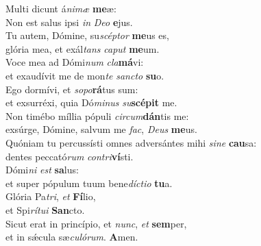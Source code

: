 \evenverse Multi dicunt á\textit{ni}\textit{mæ} \textbf{me}æ:~\*\\
\evenverse Non est salus ipsi \textit{in} \textit{De}\textit{o} \textbf{e}jus.\\
\oddverse Tu autem, Dómine, su\textit{scép}\textit{tor} \textbf{me}us es,~\*\\
\oddverse glória mea, et exál\textit{tans} \textit{ca}\textit{put} \textbf{me}um.\\
\evenverse Voce mea ad Dómi\textit{num} \textit{cla}\textbf{má}vi:~\*\\
\evenverse et exaudívit me de mon\textit{te} \textit{san}\textit{cto} \textbf{su}o.\\
\oddverse Ego dormívi, et \textit{so}\textit{po}\textbf{rá}tus sum:~\*\\
\oddverse et exsurréxi, quia Dó\textit{mi}\textit{nus} \textit{su}\textbf{scé}\textbf{pit} me.\\
\evenverse Non timébo míllia pópuli \textit{cir}\textit{cum}\textbf{dán}tis me:~\*\\
\evenverse exsúrge, Dómine, salvum me \textit{fac}, \textit{De}\textit{us} \textbf{me}us.\\
\oddverse Quóniam tu percussísti omnes adversántes mihi \textit{si}\textit{ne} \textbf{cau}sa:~\*\\
\oddverse dentes peccató\textit{rum} \textit{con}\textit{tri}\textbf{ví}sti.\\
\evenverse Dómi\textit{ni} \textit{est} \textbf{sa}lus:~\*\\
\evenverse et super pópulum tuum bene\textit{dí}\textit{cti}\textit{o} \textbf{tu}a.\\
\oddverse Glória Pa\textit{tri}, \textit{et} \textbf{Fí}lio,~\*\\
\oddverse et Spi\textit{rí}\textit{tu}\textit{i} \textbf{San}cto.\\
\evenverse Sicut erat in princípio, et \textit{nunc}, \textit{et} \textbf{sem}per,~\*\\
\evenverse et in sǽcula sæ\textit{cu}\textit{ló}\textit{rum}. \textbf{A}men.\\
